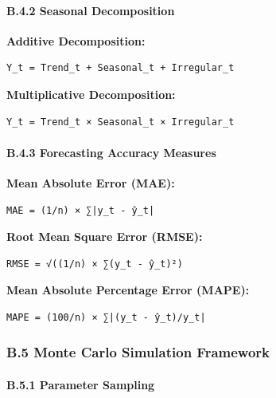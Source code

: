 \documentclass[12pt,a4paper]{article}
\begin{document}
{{{{{{\paragraph{B.4.2 Seasonal
Decomposition}\label{b.4.2-seasonal-decomposition}}

\textbf{Additive Decomposition:}

\begin{verbatim}
Y_t = Trend_t + Seasonal_t + Irregular_t
\end{verbatim}

\textbf{Multiplicative Decomposition:}

\begin{verbatim}
Y_t = Trend_t × Seasonal_t × Irregular_t
\end{verbatim}

\hypertarget{b.4.3-forecasting-accuracy-measures}{%
\paragraph{B.4.3 Forecasting Accuracy
Measures}\label{b.4.3-forecasting-accuracy-measures}}

\textbf{Mean Absolute Error (MAE):}

\begin{verbatim}
MAE = (1/n) × ∑|y_t - ŷ_t|
\end{verbatim}

\textbf{Root Mean Square Error (RMSE):}

\begin{verbatim}
RMSE = √((1/n) × ∑(y_t - ŷ_t)²)
\end{verbatim}

\textbf{Mean Absolute Percentage Error (MAPE):}

\begin{verbatim}
MAPE = (100/n) × ∑|(y_t - ŷ_t)/y_t|
\end{verbatim}

\hypertarget{b.5-monte-carlo-simulation-framework}{%
\subsubsection{B.5 Monte Carlo Simulation
Framework}\label{b.5-monte-carlo-simulation-framework}}

\hypertarget{b.5.1-parameter-sampling}{%
\paragraph{B.5.1 Parameter Sampling}\label{b.5.1-parameter-sampling}}

}}}}}
\end{document}
